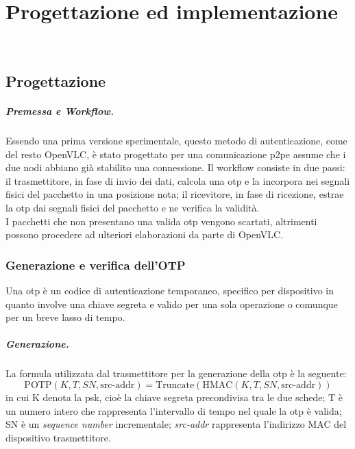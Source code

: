 \chapter{Progettazione ed implementazione}
\label{cap:progettazione}

\\

\section{Progettazione}

\paragraph{Premessa e Workflow.}
Essendo una prima versione sperimentale, questo metodo di autenticazione, come del resto OpenVLC, è stato progettato per una comunicazione \gls{p2p}\glsfirstoccur e assume che i due nodi abbiano già stabilito una connessione.
Il workflow consiste in due passi: il trasmettitore, in fase di invio dei dati, calcola una \gls{otp} e la incorpora nei segnali fisici del pacchetto in una posizione nota; il ricevitore, in fase di ricezione, estrae la \gls{otp} dai segnali fisici del pacchetto e ne verifica la validità.\\
I pacchetti che non presentano una valida \gls{otp} vengono scartati, altrimenti possono procedere ad ulteriori elaborazioni da parte di OpenVLC.


\subsection{Generazione e verifica dell'OTP}
Una \gls{otp} è un codice di autenticazione temporaneo, specifico per dispositivo in quanto involve una chiave segreta e valido per una sola operazione o comunque per un breve lasso di tempo.

\paragraph{Generazione.}
La formula utilizzata dal trasmettitore per la generazione della \gls{otp} è la seguente:
\begin{equation}
    \text{POTP}(K, T, SN, \text{src-addr}) = \text{Truncate}\left( \text{HMAC}(K, T, SN, \text{src-addr}) \right)
    \label{eq:potp}
\end{equation}
in cui K denota la \gls{psk}, cioè la chiave segreta precondivisa tra le due schede; T è un numero intero che rappresenta l'intervallo di tempo nel quale la \gls{otp} è valida; SN è un \textit{sequence number} incrementale; \textit{src-addr} rappresenta l'indirizzo MAC del dispositivo trasmettitore.

